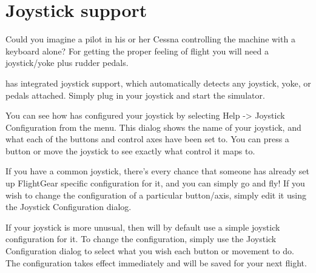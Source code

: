 {
  \section{Joystick support\label{joysticksupp}}
  Could you imagine a pilot in his or her Cessna controlling the machine with
  a keyboard alone? For getting the proper feeling of flight you will need a
  joystick/yoke plus rudder pedals.

  \FlightGear{} has integrated joystick support, which automatically detects
  any joystick, yoke, or pedals attached. Simply plug in your joystick and start
  the simulator.

  You can see how \FlightGear{} has configured your joystick by selecting
  Help -> Joystick Configuration from the menu.  This dialog shows the name
  of your joystick, and what each of the buttons and control axes have been set to.
  You can press a button or move the joystick to see exactly what control it maps to.

  If you have a common joystick, there's every chance that someone has already
  set up FlightGear specific configuration for it, and you can simply go and fly!
  If you wish to change the configuration of a particular button/axis, simply edit
  it using the Joystick Configuration dialog.

  If your joystick is more unusual, then \FlightGear{} will by default use a simple
  joystick configuration for it.  To change the configuration, simply use the Joystick
  Configuration dialog to select what you wish each button or movement to do.  The
  configuration takes effect immediately and will be saved for your next flight.

}
